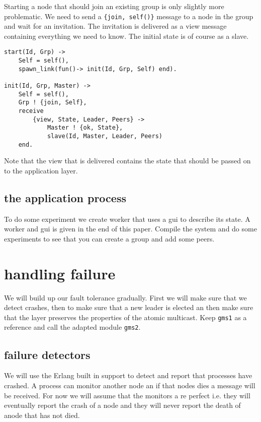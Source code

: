 \documentclass[a4paper,11pt]{article}
\begin{document}
Starting a node that should join an existing group is only slightly
more problematic. We need to send a {\tt\{join, self()\}} message to a
node in the group and wait for an invitation. The invitation is
delivered as a view message containing everything we need to
know. The initial state is of course as a slave.

\begin{verbatim}
start(Id, Grp) ->
    Self = self(),
    spawn_link(fun()-> init(Id, Grp, Self) end).    

init(Id, Grp, Master) ->
    Self = self(), 
    Grp ! {join, Self},
    receive
        {view, State, Leader, Peers} ->
            Master ! {ok, State},
            slave(Id, Master, Leader, Peers)
    end.
\end{verbatim}

Note that the view that is delivered contains the state that should be
passed on to the application layer. 

\subsection{the application process}

To do some experiment we create worker that uses a gui to describe its
state. A worker and gui is given in the end of this paper. Compile the
system and do some experiments to see that you can create a group and
add some peers. 


\section{handling failure}

We will build up our fault tolerance gradually. First we will make sure
that we detect crashes, then to make sure that a new leader is elected
an then make sure that the layer preserves the properties of the atomic
multicast. Keep {\tt gms1} as a reference and call the adapted module
{\tt gms2}.

\subsection{failure detectors}

We will use the Erlang built in support to detect and report that
processes have crashed. A process can monitor another node an if that
nodes dies a message will be received. For now we will assume that the
monitors a re perfect i.e. they will eventually report the crash of a
node and they will never report the death of anode that has not died.
\end{document}
